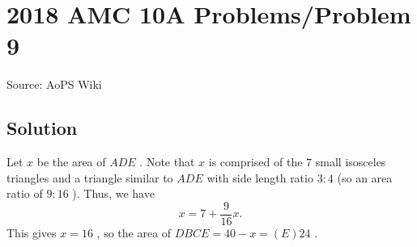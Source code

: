 \documentclass[12pt]{article}
\begin{document}
\section*{{2018 AMC 10A Problems/Problem 9}}
Source: AoPS Wiki

\subsection*{Solution}
Let $x$ be the area of $ADE$ . Note that $x$ is comprised of the $7$ small isosceles triangles and a triangle similar to $ADE$ with side length ratio $3:4$ (so an area ratio of $9:16$ ). Thus, we have \[x=7+\dfrac{9}{16}x.\] This gives $x=16$ , so the area of $DBCE=40-x=\boxed{(E) 24}$ .
\end{document}
